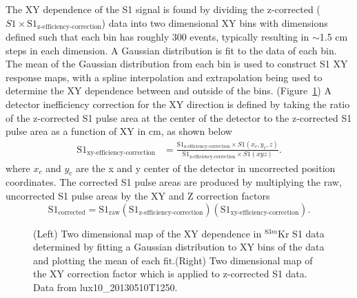 The XY dependence of the S1 signal is found by dividing the z-corrected ($S1 \times \mbox{S}1_{\mbox{z-efficiency-correction}}$) data into two dimensional XY bins with dimensions defined such that each bin has roughly 300 events, typically resulting in $\sim$1.5 cm steps in each dimension.  A Gaussian distribution is fit to the data of each bin.  The mean of the Gaussian distribution from each bin is used to construct S1 XY response maps, with a spline interpolation and extrapolation being used to determine the XY dependence between and outside of the bins. (Figure~\ref{fig:KrypCalS1XYDep}) A detector inefficiency correction for the XY direction is defined by taking the ratio of the z-corrected S1 pulse area at the center of the detector to the z-corrected S1 pulse area as a function of XY in cm, as shown below
\begin{align}
\mbox{S}1_{\mbox{xy-efficiency-correction}} &= \frac{\mbox{S}1_{\mbox{z-efficiency-correction}}\times S1(x_c,y_c,z)}{\mbox{S}1_{\mbox{z-efficiency-correction}}\times S1(xyz)}.
\end{align} 
where $x_c$ and $y_c$ are the x and y center of the detector in uncorrected position coordinates. The corrected S1 pulse areas are produced by multiplying the raw, uncorrected S1 pulse areas by the XY and Z correction factors
\begin{equation}
\mbox{S}1_{\mbox{corrected}} = \mbox{S}1_{\mbox{raw}} \left( \mbox{S}1_{\mbox{z-efficiency-correction}} \right) \left( \mbox{S}1_{\mbox{xy-efficiency-correction}} \right).
\end{equation}

\begin{figure} 
\centering
{}
\qquad
{}
\caption{ (Left) Two dimensional map of the XY dependence in $^{83m}$Kr S1 data determined by fitting a Gaussian distribution to XY bins of the data and plotting the mean of each fit.(Right) Two dimensional map of the XY correction factor which is applied to z-corrected S1 data. Data from lux10\_20130510T1250.}
\label{fig:KrypCalS1XYDep}
\end{figure}


